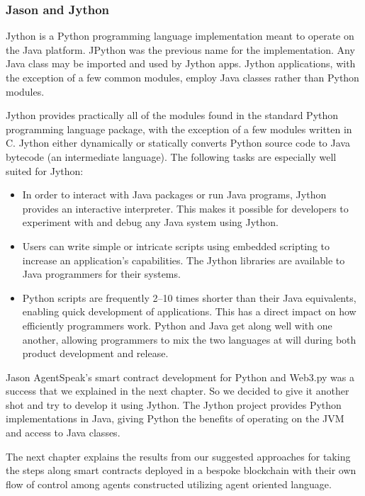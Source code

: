 \subsubsection{Jason and Jython}


Jython is a Python programming language implementation meant to operate on the Java platform. JPython was the previous name for the implementation. Any Java class may be imported and used by Jython apps. Jython applications, with the exception of a few common modules, employ Java classes rather than Python modules. 

\vspace{.5cm}
Jython provides practically all of the modules found in the standard Python programming language package, with the exception of a few modules written in C. Jython either dynamically or statically converts Python source code to Java bytecode (an intermediate language). The following tasks are especially well suited for Jython:

\begin{itemize}
    \item In order to interact with Java packages or run Java programs, Jython provides an interactive interpreter. This makes it possible for developers to experiment with and debug any Java system using Jython.
    \vspace{.5cm}
    \item Users can write simple or intricate scripts using embedded scripting to increase an application's capabilities. The Jython libraries are available to Java programmers for their systems.
    \vspace{.5cm}
     \item Python scripts are frequently 2–10 times shorter than their Java equivalents, enabling quick development of applications. This has a direct impact on how efficiently programmers work. Python and Java get along well with one another, allowing programmers to mix the two languages at will during both product development and release.
\end{itemize}

\vspace{.5cm}

Jason AgentSpeak's smart contract development for Python and Web3.py was a success that we explained in the next chapter. So we decided to give it another shot and try to develop it using Jython. The Jython project provides Python implementations in Java, giving Python the benefits of operating on the JVM and access to Java classes.

\vspace{.5cm}

The next chapter explains the results from our suggested approaches for taking the steps along smart contracts deployed in a bespoke blockchain with their own flow of control among agents constructed utilizing agent oriented language.


